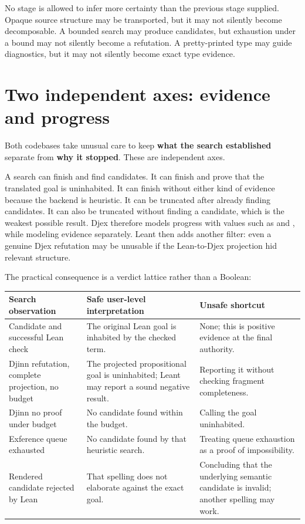 \documentclass[10pt,letterpaper,oneside]{report}
\newcommand{\code}[1]{\texttt{\detokenize{#1}}}
\newcommand{\term}[1]{\textbf{#1}}
\begin{document}
\begin{invariantbox}
No stage is allowed to infer more certainty than the previous stage supplied. Opaque source structure may be transported, but it may not silently become decomposable. A bounded search may produce candidates, but exhaustion under a bound may not silently become a refutation. A pretty-printed type may guide diagnostics, but it may not silently become exact type evidence.
\end{invariantbox}

\section{Two independent axes: evidence and progress}

Both codebases take unusual care to keep \term{what the search established} separate from \term{why it stopped}. These are independent axes.

A search can finish and find candidates. It can finish and prove that the translated goal is uninhabited. It can finish without either kind of evidence because the backend is heuristic. It can be truncated after already finding candidates. It can also be truncated without finding a candidate, which is the weakest possible result. Djex therefore models progress with values such as \code{Finished} and \code{Truncated reason}, while modeling evidence separately. Leant then adds another filter: even a genuine Djex refutation may be unusable if the Lean-to-Djex projection hid relevant structure.

The practical consequence is a verdict lattice rather than a Boolean:

\begin{center}
\begin{tabularx}{0.94\textwidth}{@{}L{0.25\textwidth}L{0.28\textwidth}Y@{}}
\toprule
\textbf{Search observation} & \textbf{Safe user-level interpretation} & \textbf{Unsafe shortcut} \\
\midrule
Candidate and successful Lean check & The original Lean goal is inhabited by the checked term. & None; this is positive evidence at the final authority. \\
Djinn refutation, complete projection, no budget & The projected propositional goal is uninhabited; Leant may report a sound negative result. & Reporting it without checking fragment completeness. \\
Djinn no proof under budget & No candidate found within the budget. & Calling the goal uninhabited. \\
Exference queue exhausted & No candidate found by that heuristic search. & Treating queue exhaustion as a proof of impossibility. \\
Rendered candidate rejected by Lean & That spelling does not elaborate against the exact goal. & Concluding that the underlying semantic candidate is invalid; another spelling may work. \\
\bottomrule
\end{tabularx}
\end{center}
\end{document}
